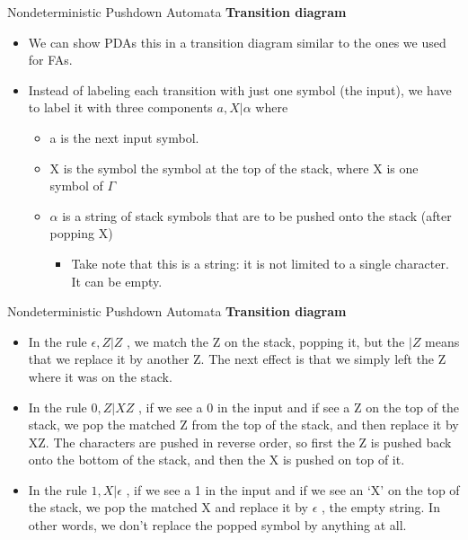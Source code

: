 \documentclass{beamer}
\begin{document}
\begin{frame}{Nondeterministic Pushdown Automata}
	\textbf{Transition diagram}
	\begin{itemize}
		\item We can show PDAs this in a transition diagram similar to the ones we used for FAs.
		\item Instead of labeling each transition with just one symbol (the input), we have to label it with three components $a,X\big|\alpha$
		where
		\begin{itemize}
			\item a	is the next input symbol.
			\item X	is the symbol the symbol at the top of the stack, where X	is one symbol of $\Gamma$
			\item	$\alpha$ is a string of stack symbols that are to be pushed onto the stack (after popping X)
			\begin{itemize}
				\item 	Take note that this is a string: it is not limited to a single character. It can be empty.
			\end{itemize}
		\end{itemize}
	\end{itemize}
\end{frame}	
\begin{frame}{Nondeterministic Pushdown Automata}
	\textbf{Transition diagram}
	\begin{itemize}
		\item In the rule $\epsilon,Z\big|Z$
		, we match the Z on the stack, popping it, but the $\big|Z$ means that we replace it by another Z. The next effect is that we simply left the Z where it was on the stack.
		\item In the rule $0,Z\big|XZ$
		, if we see a 0 in the input and if see a Z on the top of the stack, we pop the matched Z from the top of the stack, and then replace it by XZ. The characters are pushed in reverse order, so first the Z is pushed back onto the bottom of the stack, and then the X is pushed on top of it.
		\item In the rule $1,X\big|\epsilon$
		, if we see a 1 in the input and if we see an ‘X’ on the top of the stack, we pop the matched X and replace it by $\epsilon$
		, the empty string. In other words, we don’t replace the popped symbol by anything at all.
	\end{itemize}
\end{frame}	
\end{document}
